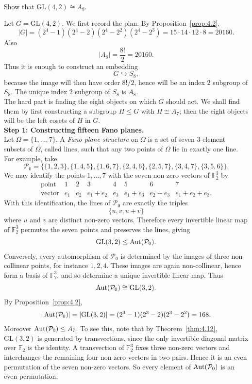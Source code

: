 \documentclass[../Odyssey_Project.tex]{subfiles}
\begin{document}
\begin{exercise}
\label{ex:4.5}
Show that $\mathrm{GL}(4, 2) \cong A_8$.
\end{exercise}
\begin{solution}
Let $G=\mathrm{GL}(4,2)$. We first record the plan. By Proposition~\ref{prop:4.2},
\[
    |G|=(2^4-1)(2^4-2)(2^4-2^2)(2^4-2^3)
    =15\cdot 14\cdot 12\cdot 8
    =20160.
\]
Also
\[
    |A_8|=\frac{8!}{2}=20160.
\]
Thus it is enough to construct an embedding
\[
    G\hookrightarrow S_8,
\]
because the image will then have order $8!/2$, hence will be an index $2$ subgroup of $S_8$. The unique index $2$ subgroup of $S_8$ is $A_8$.\\
The hard part is finding the eight objects on which $G$ should act. We shall find them by first constructing a subgroup $H\leq G$ with $H\cong A_7$; then the eight objects will be the left cosets of $H$ in $G$.\\
\noindent\textbf{Step 1: Constructing fifteen Fano planes.}\\
Let $\Omega=\{1,\ldots,7\}$. A \emph{Fano plane structure} on $\Omega$ is a set of seven $3$-element subsets of $\Omega$, called lines, such that any two points of $\Omega$ lie in exactly one line. For example, take
\[
    \mathcal P_0=
    \{\{1,2,3\},\{1,4,5\},\{1,6,7\},\{2,4,6\},\{2,5,7\},\{3,4,7\},\{3,5,6\}\}.
\]
We may identify the points $1,\ldots,7$ with the seven non-zero vectors of $\mathbb F_2^3$ by
\[
\begin{array}{c|ccccccc}
    \text{point} & 1&2&3&4&5&6&7\\
    \hline
    \text{vector} & e_1&e_2&e_1+e_2&e_3&e_1+e_3&e_2+e_3&e_1+e_2+e_3.
\end{array}
\]
With this identification, the lines of $\mathcal P_0$ are exactly the triples
\[
    \{u,v,u+v\}
\]
where $u$ and $v$ are distinct non-zero vectors. Therefore every invertible linear map of $\mathbb F_2^3$ permutes the seven points and preserves the lines, giving
\[
    \mathrm{GL}(3,2)\leq \operatorname{Aut}(\mathcal P_0).
\]
Conversely, every automorphism of $\mathcal P_0$ is determined by the images of three non-collinear points, for instance $1,2,4$. These images are again non-collinear, hence form a basis of $\mathbb F_2^3$, and so determine a unique invertible linear map. Thus
\[
    \operatorname{Aut}(\mathcal P_0)\cong \mathrm{GL}(3,2).
\]
By Proposition~\ref{prop:4.2},
\[
    |\operatorname{Aut}(\mathcal P_0)|=|\mathrm{GL}(3,2)|=(2^3-1)(2^3-2)(2^3-2^2)=168.
\]
Moreover $\operatorname{Aut}(\mathcal P_0)\leq A_7$. To see this, note that by Theorem~\ref{thm:4.12}, $\mathrm{GL}(3,2)$ is generated by transvections, since the only invertible diagonal matrix over $\mathbb F_2$ is the identity. A transvection of $\mathbb F_2^3$ fixes three non-zero vectors and interchanges the remaining four non-zero vectors in two pairs. Hence it is an even permutation of the seven non-zero vectors. So every element of $\operatorname{Aut}(\mathcal P_0)$ is an even permutation.\\

\end{solution}
\end{document}

